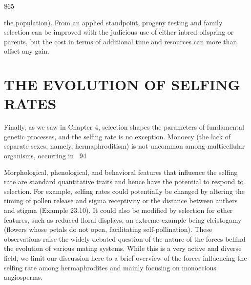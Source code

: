\documentclass{article}
\begin{document}
865

the population). From an applied standpoint, progeny testing and family selection can be improved with the judicious use of either inbred offspring or parents, but the cost in terms of additional time and resources can more than offset any gain.

\section{THE EVOLUTION OF SELFING RATES}
Finally, as we saw in Chapter 4, selection shapes the parameters of fundamental genetic processes, and the selfing rate is no exception. Monoecy (the lack of separate sexes, namely, hermaphroditism) is not uncommon among multicellular organisms, occurring in ~94%

Morphological, phenological, and behavioral features that influence the selfing rate are standard quantitative traits and hence have the potential to respond to selection. For example, selfing rates could potentially be changed by altering the timing of pollen release and sigma receptivity or the distance between anthers and stigma (Example 23.10). It could also be modified by selection for other features, such as reduced floral displays, an extreme example being cleistogamy (flowers whose petals do not open, facilitating self-pollination). These observations raise the widely debated question of the nature of the forces behind the evolution of various mating systems. While this is a very active and diverse field, we limit our discussion here to a brief overview of the forces influencing the selfing rate among hermaphrodites and mainly focusing on monoecious angiosperms.
\end{document}
